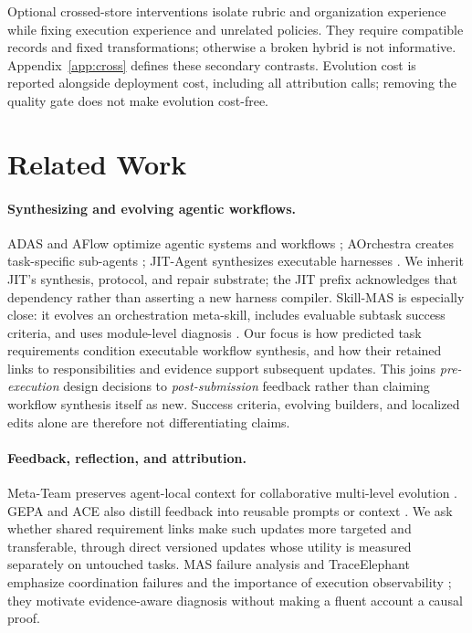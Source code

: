 \documentclass[11pt]{article}
\begin{document}
Optional crossed-store interventions isolate rubric and organization experience while fixing execution experience and unrelated policies. They require compatible records and fixed transformations; otherwise a broken hybrid is not informative. Appendix~\ref{app:cross} defines these secondary contrasts. Evolution cost is reported alongside deployment cost, including all attribution calls; removing the quality gate does not make evolution cost-free.

\section{Related Work}
\label{sec:related}

\paragraph{Synthesizing and evolving agentic workflows.}
ADAS and AFlow optimize agentic systems and workflows \citep{hu2024adas,zhang2024aflow}; AOrchestra creates task-specific sub-agents \citep{ruan2026aorchestra}; JIT-Agent synthesizes executable harnesses \citep{zhang2026jit}. We inherit JIT's synthesis, protocol, and repair substrate; the JIT prefix acknowledges that dependency rather than asserting a new harness compiler. Skill-MAS is especially close: it evolves an orchestration meta-skill, includes evaluable subtask success criteria, and uses module-level diagnosis \citep{lin2026skillmas}. Our focus is how predicted task requirements condition executable workflow synthesis, and how their retained links to responsibilities and evidence support subsequent updates. This joins \emph{pre-execution} design decisions to \emph{post-submission} feedback rather than claiming workflow synthesis itself as new. Success criteria, evolving builders, and localized edits alone are therefore not differentiating claims.

\paragraph{Feedback, reflection, and attribution.}
Meta-Team preserves agent-local context for collaborative multi-level evolution \citep{hao2026metateam}. GEPA and ACE also distill feedback into reusable prompts or context \citep{agrawal2025gepa,zhang2025ace}. We ask whether shared requirement links make such updates more targeted and transferable, through direct versioned updates whose utility is measured separately on untouched tasks. MAS failure analysis and TraceElephant emphasize coordination failures and the importance of execution observability \citep{cemri2025fail,chen2026elephant}; they motivate evidence-aware diagnosis without making a fluent account a causal proof.
\end{document}
